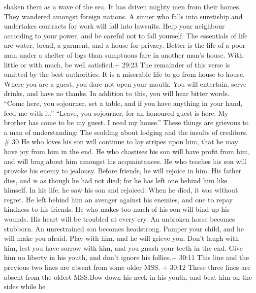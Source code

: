 shaken them as a wave of the sea. It has driven mighty men from their
homes. They wandered amongst foreign nations.  A sinner who
falls into suretiship and undertakes contracts for work will fall into
lawsuits.  Help your neighbour according to your power, and
be careful not to fall yourself.  The essentials of life
are water, bread, a garment, and a house for privacy. 
Better is the life of a poor man under a shelter of logs than sumptuous
fare in another man's house.  With little or with much, be
well satisfied.+ 29:23 The remainder of this verse is omitted by the
best authorities.  It is a miserable life to go from house
to house. Where you are a guest, you dare not open your mouth.
 You will entertain, serve drinks, and have no thanks. In
addition to this, you will hear bitter words.  ``Come here,
you sojourner, set a table, and if you have anything in your hand, feed
me with it.''  ``Leave, you sojourner, for an honoured
guest is here. My brother has come to be my guest. I need my house.''
 These things are grievous to a man of understanding: The
scolding about lodging and the insults of creditors. \# 30 
He who loves his son will continue to lay stripes upon him, that he may
have joy from him in the end.  He who chastises his son will
have profit from him, and will brag about him amongst his acquaintances.
 He who teaches his son will provoke his enemy to jealousy.
Before friends, he will rejoice in him.  His father dies,
and is as though he had not died; for he has left one behind him like
himself.  In his life, he saw his son and rejoiced. When he
died, it was without regret.  He left behind him an avenger
against his enemies, and one to repay kindness to his friends.
 He who makes too much of his son will bind up his wounds.
His heart will be troubled at every cry.  An unbroken horse
becomes stubborn. An unrestrained son becomes headstrong. 
Pamper your child, and he will make you afraid. Play with him, and he
will grieve you.  Don't laugh with him, lest you have
sorrow with him, and you gnash your teeth in the end.  Give
him no liberty in his youth, and don't ignore his follies.+ 30:11 This
line and the previous two lines are absent from some older MSS.
 + 30:12 These three lines are absent from the oldest
MSS.Bow down his neck in his youth, and beat him on the sides while he
